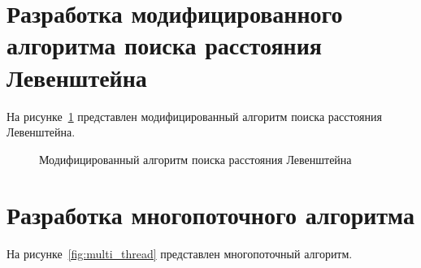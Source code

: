 \clearpage

\section{Разработка модифицированного алгоритма поиска расстояния Левенштейна}

На рисунке~\ref{fig:modif_leven} представлен модифицированный алгоритм поиска расстояния Левенштейна.

\begin{figure}[h!]
	\caption{Модифицированный алгоритм поиска расстояния Левенштейна}
	\label{fig:modif_leven}
\end{figure}

\clearpage

\section{Разработка многопоточного алгоритма}

На рисунке~\ref{fig:multi_thread} представлен многопоточный алгоритм.

